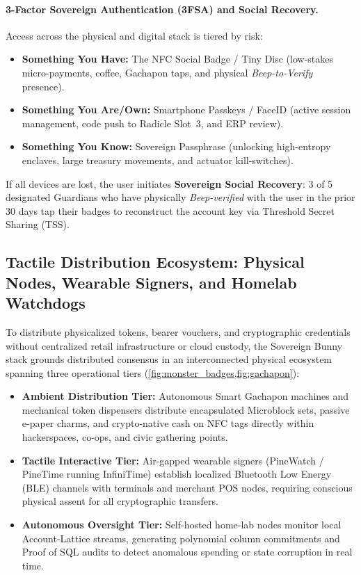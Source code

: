 \documentclass[a4paper,11pt,twoside,parskip=half-,headings=small]{scrartcl}
\begin{document}
\paragraph{3-Factor Sovereign Authentication (3FSA) and Social Recovery.}
Access across the physical and digital stack is tiered by risk:
\begin{itemize}[nosep]
  \item \textbf{Something You Have:} The NFC Social Badge / Tiny Disc (low-stakes micro-payments, coffee, Gachapon taps, and physical \emph{Beep-to-Verify} presence).
  \item \textbf{Something You Are/Own:} Smartphone Passkeys / FaceID (active session management, code push to Radicle Slot~3, and ERP review).
  \item \textbf{Something You Know:} Sovereign Passphrase (unlocking high-entropy enclaves, large treasury movements, and actuator kill-switches).
\end{itemize}
If all devices are lost, the user initiates \textbf{Sovereign Social Recovery}: 3 of 5 designated Guardians who have physically \emph{Beep-verified} with the user in the prior 30 days tap their badges to reconstruct the account key via Threshold Secret Sharing (TSS).

\subsection{Tactile Distribution Ecosystem: Physical Nodes, Wearable Signers, and Homelab Watchdogs}

To distribute physicalized tokens, bearer vouchers, and cryptographic credentials without centralized retail infrastructure or cloud custody, the Sovereign Bunny stack grounds distributed consensus in an interconnected physical ecosystem spanning three operational tiers (\cref{fig:monster_badges,fig:gachapon}):
\begin{itemize}[nosep]
  \item \textbf{Ambient Distribution Tier:} Autonomous Smart Gachapon machines and mechanical token dispensers distribute encapsulated Microblock sets, passive e-paper charms, and crypto-native cash on NFC tags directly within hackerspaces, co-ops, and civic gathering points.
  \item \textbf{Tactile Interactive Tier:} Air-gapped wearable signers (PineWatch / PineTime running InfiniTime) establish localized Bluetooth Low Energy (BLE) channels with terminals and merchant POS nodes, requiring conscious physical assent for all cryptographic transfers.
  \item \textbf{Autonomous Oversight Tier:} Self-hosted home-lab nodes monitor local Account-Lattice streams, generating polynomial column commitments and Proof of SQL audits to detect anomalous spending or state corruption in real time.
\end{itemize}
\end{document}
